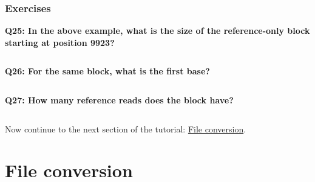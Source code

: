\documentclass[11pt]{article}
\makeatletter
\newcommand{\boxspacing}{\kern\kvtcb@left@rule\kern\kvtcb@boxsep}
\newcommand{\prompt}[4]{
        \ttfamily\llap{{\color{#2}\LARGE\faKeyboardO\hspace{3pt}#4}}\vspace{-\baselineskip}
    }
\makeatother
\begin{document}
    \hypertarget{exercises}{%
\subsubsection{Exercises}\label{exercises}}

\textbf{Q25: In the above example, what is the size of the
reference-only block starting at position 9923?}

    \begin{tcolorbox}[breakable, size=fbox, boxrule=1pt, pad at break*=1mm,colback=cellbackground, colframe=cellborder]
\prompt{In}{incolor}{ }{\boxspacing}
\begin{Verbatim}[commandchars=\\\{\}]

\end{Verbatim}
\end{tcolorbox}

    \textbf{Q26: For the same block, what is the first base?}

    \begin{tcolorbox}[breakable, size=fbox, boxrule=1pt, pad at break*=1mm,colback=cellbackground, colframe=cellborder]
\prompt{In}{incolor}{ }{\boxspacing}
\begin{Verbatim}[commandchars=\\\{\}]

\end{Verbatim}
\end{tcolorbox}

    \textbf{Q27: How many reference reads does the block have?}

    \begin{tcolorbox}[breakable, size=fbox, boxrule=1pt, pad at break*=1mm,colback=cellbackground, colframe=cellborder]
\prompt{In}{incolor}{ }{\boxspacing}
\begin{Verbatim}[commandchars=\\\{\}]

\end{Verbatim}
\end{tcolorbox}

    Now continue to the next section of the tutorial:
\href{conversion.ipynb}{File conversion}.





\newpage





    \hypertarget{file-conversion}{%
\section{File conversion}\label{file-conversion}}
\end{document}
